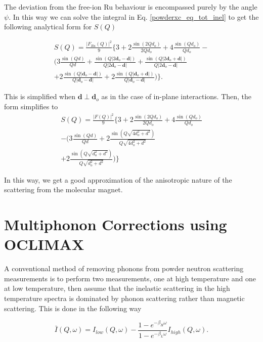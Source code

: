 \documentclass[%
 reprint,
superscriptaddress,
 amsmath,amssymb,
 aps,
 prb,
]{revtex4-2}
\begin{document}
The deviation from the free-ion Ru behaviour is encompassed purely by the angle $\psi$. In this way we can solve the integral in Eq. \ref{powderxc_eq_tot_inel} to get the following analytical form for $S(Q)$

\begin{multline}
    S(Q) = \frac{|F_{Ru}(Q)|^2}{9} \big\{3+2\frac{\sin{(2Qd_o)}}{2Qd_o} +4\frac{\sin{(Qd_o)}}{Qd_o} -\\
    (3\frac{\sin{(Qd)}}{Qd} + \frac{\sin{(Q|2\textbf{d}_o - \textbf{d}|)}}{Q|2\textbf{d}_o-\textbf{d}|} +\frac{\sin{(Q|2\textbf{d}_o + \textbf{d}|)}}{Q|2\textbf{d}_o - \textbf{d}|}\\
    +2\frac{\sin{(Q|\textbf{d}_o - \textbf{d}|)}}{Q|\textbf{d}_o - \textbf{d}|} + 2\frac{\sin{(Q|\textbf{d}_o + \textbf{d}|)}}{Q|\textbf{d}_o - \textbf{d}|})\big\}. 
    \label{eq:exact_sq_long}
\end{multline}

This is simplified when $\textbf{d} \perp \textbf{d}_o$ as in the case of in-plane interactions. Then, the form simplifies to
\begin{multline}
    S(Q) = \frac{|F(Q)|^2}{9}\big\{ 3 + 2 \frac{\sin{(2Qd_o)}}{2Qd_o} + 4 \frac{\sin{(Qd_o)}}{Qd_o}\\
    -(3\frac{\sin{(Qd)}}{Qd} + 2\frac{\sin{(Q\sqrt{4d_o^2 + d^2})}}{Q\sqrt{4d_o^2 +d^2}}\\
    +2\frac{\sin{(Q\sqrt{d_o^2 + d^2})}}{Q\sqrt{d_o^2 + d^2}})\big\}
    \label{eq:exact_sq}
\end{multline}

In this way, we get a good approximation of the anisotropic nature of the scattering from the molecular magnet.

\section{Multiphonon Corrections using OCLIMAX}
\label{sec:magscatter_appendix}
A conventional method of removing phonons from powder neutron scattering measurements is to perform two measurements, one at high temperature and one at low temperature, then assume that the inelastic scattering in the high temperature spectra is dominated by phonon scattering rather than magnetic scattering. This is done in the following way

\begin{equation}
    \bar{I}(Q,\omega) = I_{low}(Q,\omega) - \frac{1-e^{-\beta_H\omega}}{1-e^{-\beta_L\omega}}I_{high}(Q,\omega).
    \label{phonon_sub_eq}
\end{equation}
\end{document}
